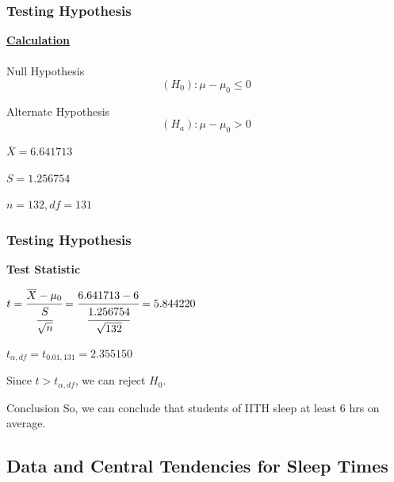 \documentclass[11pt,]{beamer}
\begin{document}
\begin{frame}
    
    \frametitle{Testing Hypothesis}
    
    \setcounter{equation}{0}
    
    \textbf{\underline{Calculation}}\\
    \\
    Null Hypothesis
    \begin{equation}
         (H_0) :  \mu - \mu_{0} \leq 0
    \end{equation}
    
    \bigskip
    
    Alternate Hypothesis
    \begin{equation}
        (H_a) : \mu - \mu_{0} > 0
    \end{equation}
    
    $\overline{X} = 6.641713$
    
    \bigskip
    
    $S = 1.256754$
    
    \bigskip 
    
    $ n = 132 , df = 131$
\end{frame}

\begin{frame}

    \frametitle{Testing Hypothesis}
    
    \textbf{Test Statistic}
    
    \bigskip
    
    $t = \cfrac{\overline{X} - \mu_0}{\cfrac{S}{\sqrt{n}}}  = \cfrac{6.641713 - 6}{\cfrac{1.256754}{\sqrt{132}}} = 5.844220$
    
    \bigskip
    
    $t_{\alpha, df} = t_{0.01, 131} = 2.355150$
    
    \bigskip
    
    Since $ t > t_{\alpha, df}$, we can reject $H_0$. 
    
    \begin{block}{Conclusion}
        So, we can conclude that students of IITH  sleep at least $6$ hrs on average.
    \end{block}
    
\end{frame}

\subsection{Data and Central Tendencies for Sleep Times}
\end{document}
